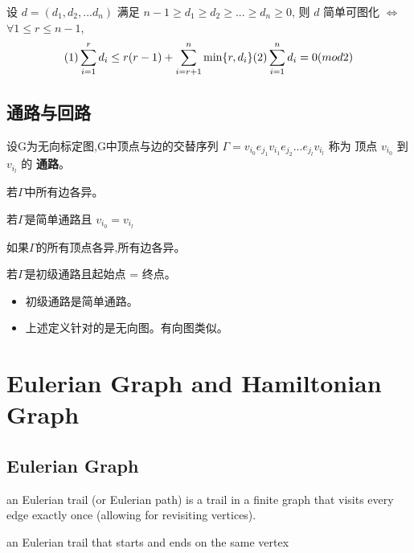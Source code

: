 \documentclass[11pt,fleqn]{book} %
\begin{document}
\begin{CJK}{UTF8}{gkai}
\begin{theorem}
     设 $d = (d_1, d_2 ,... d_n)$ 满足 $n-1 \geq d_1 \geq 
    d_2 \geq ... \geq d_n \geq 0$, 则 $d$ 简单可图化 $\iff$ $\forall 1 \leq r \leq n - 1$, 
    \[
        (1)\sum_{i = 1}^r d_i \leq r(r -1) + \sum_{i = r + 1}^{n} \min\{r, d_i\} \newline (2) \sum_{i = 1}^{n} d_i = 0 (mod 2)
        \]
\end{theorem}
\section{通路与回路}

\begin{definition}[通路]
    设G为无向标定图,G中顶点与边的交替序列 $\Gamma = v_{i_0}e_{j_1}v_{i_1}e_{j_2}...e_{j_l}v_{i_l}$ 称为
    顶点 $v_{i_0}$ 到 $v_{i_l}$ 的 \textbf{通路}。
\end{definition}

\begin{definition}
    [简单通路]
    若$\Gamma$中所有边各异。
\end{definition}
\begin{definition}
    [简单回路]
    若$\Gamma$是简单通路且 $v_{i_0} = v_{i_l}$
\end{definition}

\begin{definition}
    [初级通路，路径]
    如果$\Gamma$的所有顶点各异,所有边各异。
\end{definition}

\begin{definition}
  [初级回路，圈] 
  若$\Gamma$是初级通路且起始点 = 终点。   
\end{definition}

\begin{remark}
    \begin{itemize}
        \item 初级通路是简单通路。
        \item 上述定义针对的是无向图。有向图类似。
    \end{itemize}
    
\end{remark}

\chapter{Eulerian Graph and Hamiltonian Graph}
\section{Eulerian Graph}
\begin{definition}
     an Eulerian trail (or Eulerian path) is a trail in a finite graph that visits every edge exactly once (allowing for revisiting vertices).
\end{definition}
\begin{definition}
     an Eulerian trail that starts and ends on the same vertex
\end{definition}


\end{CJK}
\end{document}
